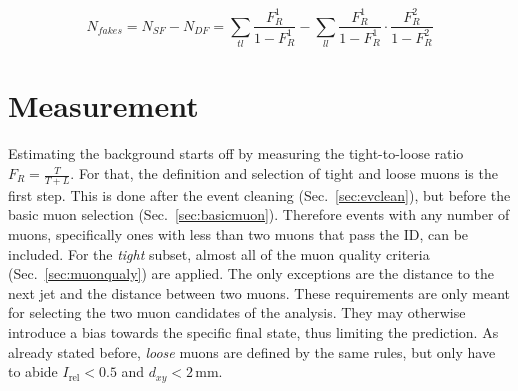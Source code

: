 \begin{equation}
  \label{eq:fakes}
  N_{fakes} = N_{SF} - N_{DF} =  \sum_{tl} \frac{F_R^1}{1 - F_R^1} - \sum_{ll} \frac{F_R^1}{1 - F_R^1} \cdot \frac{F_R^2}{1 - F_R^2}
\end{equation}


\section{Measurement}
\label{sec:tlmeasurement}

Estimating the background starts off by measuring the tight-to-loose ratio $F_R = \frac{T}{T+L}$. For that, the definition and selection of tight and loose muons is the first step. This is done after the event cleaning (Sec.~\ref{sec:evclean}), but before the basic muon selection (Sec.~\ref{sec:basicmuon}). Therefore events with any number of muons, specifically ones with less than two muons that pass the ID, can be included. For the \textit{tight} subset, almost all of the muon quality criteria (Sec.~\ref{sec:muonqualy}) are applied. The only exceptions are the distance to the next jet and the distance between two muons. These requirements are only meant for selecting the two muon candidates of the analysis. They may otherwise introduce a bias towards the specific final state, thus limiting the prediction. As already stated before, \textit{loose} muons are defined by the same rules, but only have to abide $I_{\text{rel}} < 0.5$ and $d_{xy} < 2\,\text{mm}$.

